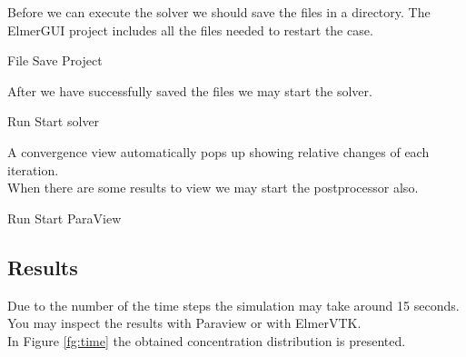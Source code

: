Before we can execute the solver we should save the files in a directory.  The ElmerGUI project includes all the files needed to restart the case.

\ttbegin
File 
  Save Project
\ttend

After we have successfully saved the files we may start the solver.

\ttbegin
Run
  Start solver
\ttend

A convergence view automatically pops up showing relative changes of each iteration.\\

When there are some results to view we may start the postprocessor also.

\ttbegin
Run
  Start ParaView
\ttend

\subsection*{Results}

Due to the number of the time steps the simulation may take around 15 seconds.\\

You may inspect the results with Paraview or with ElmerVTK.\\

In Figure \ref{fg:time} the obtained concentration distribution is presented. 

